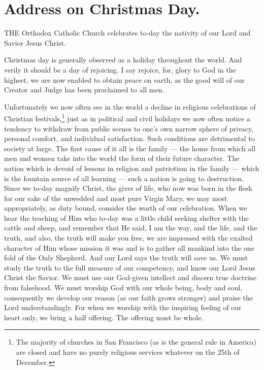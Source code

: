 \chapter{Address on Christmas Day.}

THE Orthodox Catholic Church celebrates 
to-day the nativity of our Lord and Savior 
Jesus Christ. 

Christmas day is generally observed as a holiday
throughout the world. And verily it should 
be a day of rejoicing. I say rejoice, for, glory 
to God in the highest, we are now enabled to 
obtain peace on earth, as the good will of our 
Creator and Judge has been proclaimed to all 
men. 

Unfortunately we now often see in the world 
a decline in religious celebrations of Christian 
festivals,\footnote{The majority of churches in San Francisco (as is the 
general rule in America) are closed and have no purely 
religious services whatever on the 25th of December.}
just as in political and civil holidays 
we now often notice a tendency to withdraw from 
public scenes to one's own narrow sphere of 
privacy, personal comfort, and individual satisfaction.
Such conditions are detrimental to society
at large. The first cause of it all is the 
family — the home from which all men and 
women take into the world the form of their 
future character. The nation which is devoid 
of lessons in religion and patriotism in the 
family — which is the fountain source of all 
learning — such a nation is going to destruction. 
Since we to-day magnify Christ, the giver of 
life, who now was born in the flesh for our sake 
of the unwedded and most pure Virgin Mary, 
we may most appropriately, as duty bound, consider
the worth of our celebration. When we 
hear the teaching of Him who to-day was a little 
child seeking shelter with the cattle and sheep, 
and remember that He said, I am the way, and 
the life, and the truth, and also, the truth will 
make you free, we are impressed with the exalted 
character of Him whose mission it was and is 
to gather all mankind into the one fold of the 
Only Shepherd. And our Lord says the truth 
will save us. We must study the truth to the 
full measure of our competency, and know our 
Lord Jesus Christ the Savior. We must use 
our God-given intellect and discern true doctrine 
from falsehood. We must worship God with our 
whole being, body and soul, consequently we 
develop our reason (as our faith grows stronger) 
and praise the Lord understandingly. For when 
we worship with the inspiring feeling of our 
heart only, we bring a half offering. The offering
must be whole. 

